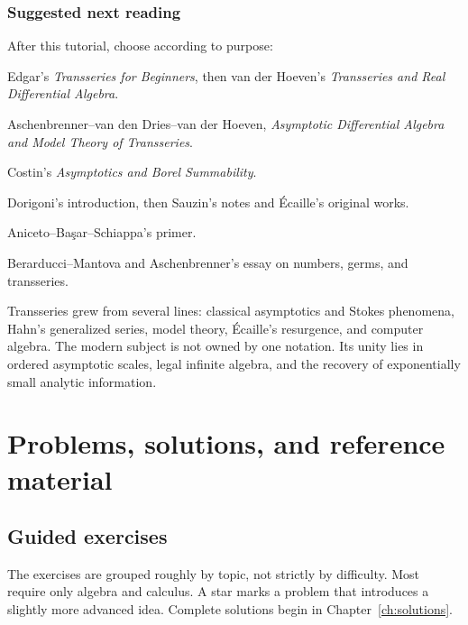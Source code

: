 \documentclass[11pt,oneside]{book}
\theoremstyle{definition}
\theoremstyle{remark}
\begin{document}
\section{Suggested next reading}

After this tutorial, choose according to purpose:
\begin{description}[style=nextline]
\item[Formal calculations]
Edgar's \emph{Transseries for Beginners}, then van der Hoeven's
\emph{Transseries and Real Differential Algebra}.
\item[Ordered differential algebra]
Aschenbrenner--van den Dries--van der Hoeven,
\emph{Asymptotic Differential Algebra and Model Theory of Transseries}.
\item[Borel summation and rigorous ODEs]
Costin's \emph{Asymptotics and Borel Summability}.
\item[Alien calculus]
Dorigoni's introduction, then Sauzin's notes and \'Ecaille's original works.
\item[Physics and detailed examples]
Aniceto--Ba\c{s}ar--Schiappa's primer.
\item[Surreal connections]
Berarducci--Mantova and Aschenbrenner's essay on numbers, germs, and transseries.
\end{description}

\begin{summarybox}
Transseries grew from several lines: classical asymptotics and Stokes phenomena,
Hahn's generalized series, model theory, \'Ecaille's resurgence, and computer
algebra. The modern subject is not owned by one notation. Its unity lies in
ordered asymptotic scales, legal infinite algebra, and the recovery of
exponentially small analytic information.
\end{summarybox}

\part{Problems, solutions, and reference material}

\chapter{Guided exercises}
\label{ch:exercises}

The exercises are grouped roughly by topic, not strictly by difficulty. Most
require only algebra and calculus. A star marks a problem that introduces a
slightly more advanced idea. Complete solutions begin in
Chapter~\ref{ch:solutions}.
\end{document}
